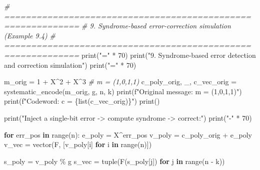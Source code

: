 \documentclass[
]{article}
\newenvironment{Shaded}{}{}
\newcommand{\BuiltInTok}[1]{\textcolor[rgb]{0.00,0.50,0.00}{#1}}
\newcommand{\CommentTok}[1]{\textcolor[rgb]{0.38,0.63,0.69}{\textit{#1}}}
\newcommand{\ControlFlowTok}[1]{\textcolor[rgb]{0.00,0.44,0.13}{\textbf{#1}}}
\newcommand{\DecValTok}[1]{\textcolor[rgb]{0.25,0.63,0.44}{#1}}
\newcommand{\KeywordTok}[1]{\textcolor[rgb]{0.00,0.44,0.13}{\textbf{#1}}}
\newcommand{\NormalTok}[1]{#1}
\newcommand{\OperatorTok}[1]{\textcolor[rgb]{0.40,0.40,0.40}{#1}}
\newcommand{\SpecialCharTok}[1]{\textcolor[rgb]{0.25,0.44,0.63}{#1}}
\newcommand{\SpecialStringTok}[1]{\textcolor[rgb]{0.73,0.40,0.53}{#1}}
\newcommand{\StringTok}[1]{\textcolor[rgb]{0.25,0.44,0.63}{#1}}
\begin{document}
\begin{Shaded}
\begin{Highlighting}[]
\CommentTok{\# ============================================================}
\CommentTok{\# 9. Syndrome{-}based error{-}correction simulation (Example 9.4)}
\CommentTok{\# ============================================================}
\BuiltInTok{print}\NormalTok{(}\StringTok{"="} \OperatorTok{*} \DecValTok{70}\NormalTok{)}
\BuiltInTok{print}\NormalTok{(}\StringTok{"9. Syndrome{-}based error detection and correction simulation"}\NormalTok{)}
\BuiltInTok{print}\NormalTok{(}\StringTok{"="} \OperatorTok{*} \DecValTok{70}\NormalTok{)}

\NormalTok{m\_orig }\OperatorTok{=} \DecValTok{1} \OperatorTok{+}\NormalTok{ X}\OperatorTok{\^{}}\DecValTok{2} \OperatorTok{+}\NormalTok{ X}\OperatorTok{\^{}}\DecValTok{3}  \CommentTok{\# m = (1,0,1,1)}
\NormalTok{c\_poly\_orig, \_, c\_vec\_orig }\OperatorTok{=}\NormalTok{ systematic\_encode(m\_orig, g, n, k)}
\BuiltInTok{print}\NormalTok{(}\SpecialStringTok{f"Original message: m = (1,0,1,1)"}\NormalTok{)}
\BuiltInTok{print}\NormalTok{(}\SpecialStringTok{f"Codeword:         c = }\SpecialCharTok{\{}\BuiltInTok{list}\NormalTok{(c\_vec\_orig)}\SpecialCharTok{\}}\SpecialStringTok{"}\NormalTok{)}
\BuiltInTok{print}\NormalTok{()}

\BuiltInTok{print}\NormalTok{(}\StringTok{"Inject a single{-}bit error {-}\textgreater{} compute syndrome {-}\textgreater{} correct:"}\NormalTok{)}
\BuiltInTok{print}\NormalTok{(}\StringTok{"{-}"} \OperatorTok{*} \DecValTok{70}\NormalTok{)}

\ControlFlowTok{for}\NormalTok{ err\_pos }\KeywordTok{in} \BuiltInTok{range}\NormalTok{(n):}
\NormalTok{    e\_poly }\OperatorTok{=}\NormalTok{ X}\OperatorTok{\^{}}\NormalTok{err\_pos}
\NormalTok{    v\_poly }\OperatorTok{=}\NormalTok{ c\_poly\_orig }\OperatorTok{+}\NormalTok{ e\_poly}
\NormalTok{    v\_vec }\OperatorTok{=}\NormalTok{ vector(F, [v\_poly[i] }\ControlFlowTok{for}\NormalTok{ i }\KeywordTok{in} \BuiltInTok{range}\NormalTok{(n)])}

\NormalTok{    s\_poly }\OperatorTok{=}\NormalTok{ v\_poly }\OperatorTok{\%}\NormalTok{ g}
\NormalTok{    s\_vec }\OperatorTok{=} \BuiltInTok{tuple}\NormalTok{(F(s\_poly[j]) }\ControlFlowTok{for}\NormalTok{ j }\KeywordTok{in} \BuiltInTok{range}\NormalTok{(n }\OperatorTok{{-}}\NormalTok{ k))}


\end{Highlighting}
\end{Shaded}
\end{document}
